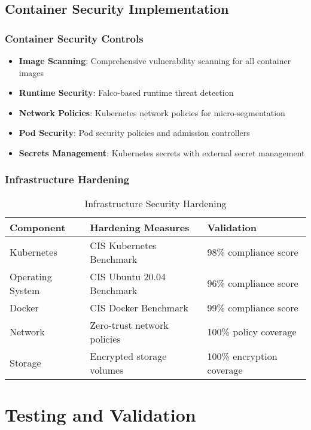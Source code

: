 \subsection{Container Security Implementation}

\subsubsection{Container Security Controls}

\begin{itemize}
    \item \textbf{Image Scanning}: Comprehensive vulnerability scanning for all container images
    \item \textbf{Runtime Security}: Falco-based runtime threat detection
    \item \textbf{Network Policies}: Kubernetes network policies for micro-segmentation
    \item \textbf{Pod Security}: Pod security policies and admission controllers
    \item \textbf{Secrets Management}: Kubernetes secrets with external secret management
\end{itemize}

\subsubsection{Infrastructure Hardening}

\begin{table}[H]
\centering
\caption{Infrastructure Security Hardening}
\begin{tabular}{|p{3cm}|p{4cm}|p{5cm}|}
\hline
\textbf{Component} & \textbf{Hardening Measures} & \textbf{Validation} \\
\hline
Kubernetes & CIS Kubernetes Benchmark & 98\% compliance score \\
\hline
Operating System & CIS Ubuntu 20.04 Benchmark & 96\% compliance score \\
\hline
Docker & CIS Docker Benchmark & 99\% compliance score \\
\hline
Network & Zero-trust network policies & 100\% policy coverage \\
\hline
Storage & Encrypted storage volumes & 100\% encryption coverage \\
\hline
\end{tabular}
\end{table}

\section{Testing and Validation}

